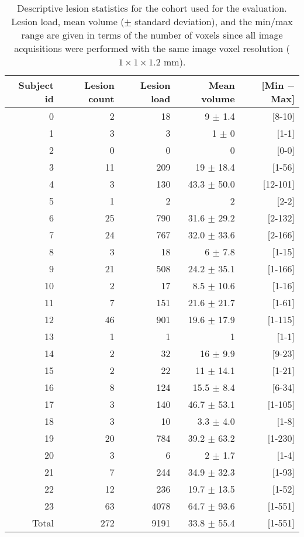 \begin{table}[!htb]
  \centering
  \begin{tabular*}{1.0\textwidth}{@{\extracolsep{\fill}} rrrrr}
    \textbf{Subject id} & \textbf{Lesion count} & \textbf{Lesion load} & \textbf{Mean volume} & \textbf{[Min $-$ Max]} \\
    \toprule
    \midrule
    0 & 2 & 18 & 9 $\pm$ 1.4 & [8-10] \\
    1 & 3 & 3 & 1 $\pm$ 0 & [1-1] \\
    2 & 0 & 0 & 0 & [0-0] \\
    3 & 11 & 209 & 19 $\pm$ 18.4 & [1-56] \\
    4 & 3 & 130 & 43.3 $\pm$ 50.0 & [12-101] \\
    5 & 1 & 2 & 2 & [2-2] \\
    6 & 25 & 790 & 31.6 $\pm$ 29.2 & [2-132] \\
    7 & 24 & 767 & 32.0 $\pm$ 33.6 & [2-166] \\
    8 & 3 & 18 & 6 $\pm$ 7.8 & [1-15] \\
    9 & 21 & 508 & 24.2 $\pm$ 35.1 & [1-166] \\
    10 & 2 & 17 & 8.5 $\pm$ 10.6 & [1-16] \\
    11 & 7 & 151 & 21.6 $\pm$ 21.7 & [1-61] \\
    12 & 46 & 901 & 19.6 $\pm$ 17.9 & [1-115] \\
    13 & 1 & 1 & 1 & [1-1] \\
    14 & 2 & 32 & 16 $\pm$ 9.9 & [9-23] \\
    15 & 2 & 22 & 11 $\pm$ 14.1 & [1-21] \\
    16 & 8 & 124 & 15.5 $\pm$ 8.4 & [6-34] \\
    17 & 3 & 140 & 46.7 $\pm$ 53.1 & [1-105] \\
    18 & 3 & 10 & 3.3 $\pm$ 4.0 & [1-8] \\
    19 & 20 & 784 & 39.2 $\pm$ 63.2 & [1-230] \\
    20 & 3 & 6 & 2 $\pm$ 1.7 & [1-4] \\
    21 & 7 & 244 & 34.9 $\pm$ 32.3 & [1-93] \\
    22 & 12 & 236 & 19.7 $\pm$ 13.5 & [1-52] \\
    23 & 63 & 4078 & 64.7 $\pm$ 93.6 & [1-551] \\
    \midrule
    Total & 272 & 9191 & 33.8 $\pm$ 55.4 & [1-551] \\
    \midrule
    \bottomrule
  \end{tabular*}
\label{table:trainingData}
\caption{Descriptive lesion statistics for the cohort used for the evaluation.
         Lesion load, mean volume ($\pm$ standard deviation), and the min/max range are given in terms of
         the number of voxels
         since all image acquisitions were performed with the same image
         voxel resolution ($1\times1\times1.2$ mm).
         }
\end{table}
